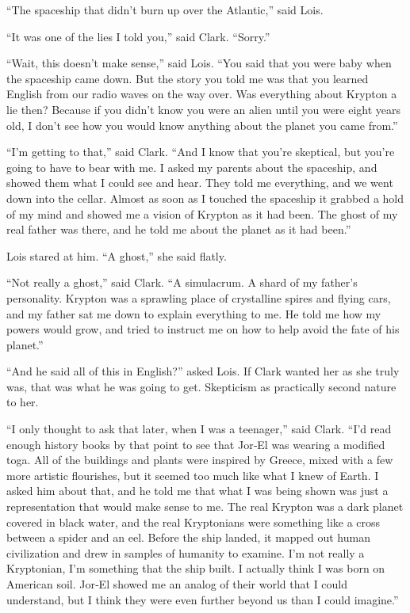 \documentclass[ebook,12pt]{memoir}
\begin{document}
``The spaceship that didn't burn up over the Atlantic,'' said Lois.

``It was one of the lies I told you,'' said Clark. ``Sorry.''

``Wait, this doesn't make sense,'' said Lois. ``You said that you were
baby when the spaceship came down. But the story you told me was that
you learned English from our radio waves on the way over. Was everything
about Krypton a lie then? Because if you didn't know you were an alien
until you were eight years old, I don't see how you would know anything
about the planet you came from.''

``I'm getting to that,'' said Clark. ``And I know that you're skeptical,
but you're going to have to bear with me. I asked my parents about the
spaceship, and showed them what I could see and hear. They told me
everything, and we went down into the cellar. Almost as soon as I
touched the spaceship it grabbed a hold of my mind and showed me a
vision of Krypton as it had been. The ghost of my real father was there,
and he told me about the planet as it had been.''

Lois stared at him. ``A ghost,'' she said flatly.

``Not really a ghost,'' said Clark. ``A simulacrum. A shard of my
father's personality. Krypton was a sprawling place of crystalline
spires and flying cars, and my father sat me down to explain everything
to me. He told me how my powers would grow, and tried to instruct me on
how to help avoid the fate of his planet.''

``And he said all of this in English?'' asked Lois. If Clark wanted her
as she truly was, that was what he was going to get. Skepticism as
practically second nature to her.

``I only thought to ask that later, when I was a teenager,'' said Clark.
``I'd read enough history books by that point to see that Jor‐El was
wearing a modified toga. All of the buildings and plants were inspired
by Greece, mixed with a few more artistic flourishes, but it seemed too
much like what I knew of Earth. I asked him about that, and he told me
that what I was being shown was just a representation that would make
sense to me. The real Krypton was a dark planet covered in black water,
and the real Kryptonians were something like a cross between a spider
and an eel. Before the ship landed, it mapped out human civilization and
drew in samples of humanity to examine. I'm not really a Kryptonian, I'm
something that the ship built. I actually think I was born on American
soil. Jor‐El showed me an analog of their world that I could understand,
but I think they were even further beyond us than I could imagine.''
\end{document}
